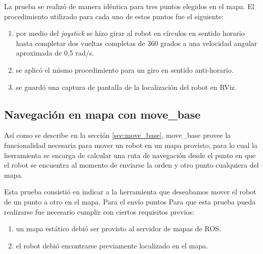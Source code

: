 La prueba se realizó de manera idéntica para tres puntos elegidos en el mapa. El procedimiento utilizado para cada uno de estos puntos fue el siguiente:

\begin{enumerate}
    \item por medio del \textit{joystick} se hizo girar al robot en círculos en sentido horario hasta completar dos vueltas completas de 360 grados a una velocidad angular aproximada de 0,5 rad/s.
    \item se aplicó el mismo procedimiento para un giro en sentido anti-horario.
    \item se guardó una captura de pantalla de la localización del robot en RViz.
\end{enumerate}


\subsection{Navegación en mapa con move\_base}

Así como se describe en la sección \ref{sec:move_base}, move\_base provee la funcionalidad necesaria para mover un robot en un mapa provisto, para lo cual la herramienta se encarga de calcular una ruta de navegación desde el punto en que el robot se encuentra al momento de enviarse la orden y otro punto cualquiera del mapa.

Esta prueba consistió en indicar a la herramienta que deseabamos mover el robot de un punto a otro en el mapa. Para el envío puntos  
Para que esta prueba pueda realizarse fue necesario cumplir con ciertos requisitos previos:

\begin{enumerate}
    \item un mapa estático debió ser provisto al servidor de mapas de ROS.
    \item el robot debió encontrarse previamente localizado en el mapa.
\end{enumerate}

